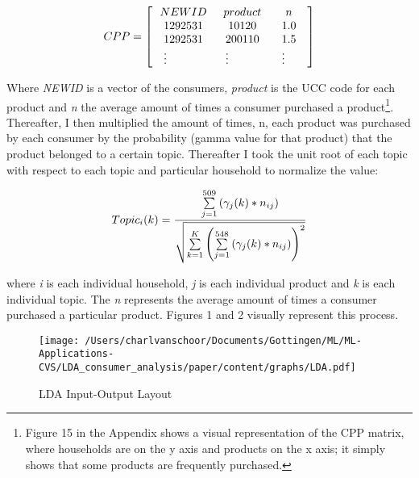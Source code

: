\begin{equation}\centering
	CPP = \left[ {\begin{array}{*{20}{c}}
{NEWID}&{product}&n\\
{1292531}&{10120}&{1.0}\\
\begin{array}{l}
1292531\\
 \vdots 
\end{array}&\begin{array}{l}
200110\\
 \vdots 
\end{array}&\begin{array}{l}
1.5\\
 \vdots 
\end{array}
\end{array}} \right]
\end{equation}


 
 Where \textit{NEWID} is a vector of the consumers, \textit{product} is the UCC code for each product and \textit{n} the average amount of times a consumer purchased a product\footnote{Figure 15 in the Appendix shows a visual representation of the CPP matrix, where households are on the y axis and products on the x axis; it simply shows that some products are frequently purchased.}. Thereafter, I then multiplied the amount of times, n, each product was purchased by each consumer by the probability (gamma value for that product) that the product belonged to a certain topic. Thereafter I took the unit root of each topic with respect to each topic and particular household to normalize the value:




\begin{equation}\centering
	Topi{c_i}(k) = \frac{{\sum\limits_{j = 1}^{509} {({\gamma _j}(k)*{n_{ij}})} }}{{\sqrt {\sum\limits_{k = 1}^K {{{\left( {\sum\limits_{j = 1}^{548} {({\gamma _j}(k)*{n_{ij}})} } \right)}^2}} } }}
\end{equation}



where \textit{i} is each individual household, \textit{j} is each individual product and \textit{k} is each individual topic. The \textit{n} represents the average amount of times a consumer purchased a particular product. Figures 1 and 2 visually represent this process. 
\


\begin{figure}[!h]
\texttt{[image: /Users/charlvanschoor/Documents/Gottingen/ML/ML-Applications-CVS/LDA\_consumer\_analysis/paper/content/graphs/LDA.pdf]}
\caption{LDA Input-Output Layout}
\end{figure}

